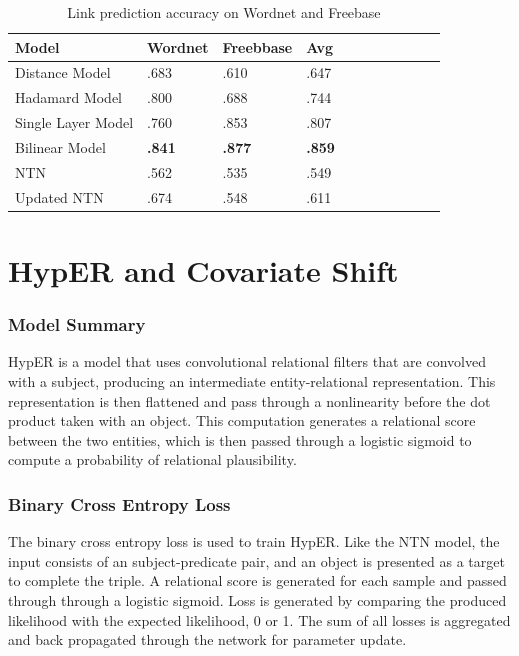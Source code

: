 \begin{table}[H]
	\centering
	\begin{tabular}{lllllllllll}
  		\textbf{Model} & \textbf{Wordnet} & \textbf{Freebbase} & \textbf{Avg} \\
  		\hline
  		Distance Model & .683 & .610 & .647 \\
  		Hadamard Model & .800 & .688 & .744 \\
  		Single Layer Model & .760 & .853 & .807 \\
  		Bilinear Model & \textbf{.841} & \textbf{.877} & \textbf{.859} \\
  		NTN & .562 & .535 & .549 \\
  		\hline
  		Updated NTN & .674 & .548 & .611 \\
	\end{tabular}
	\caption{Link prediction accuracy on Wordnet and Freebase}
\end{table}



\section{HypER and Covariate Shift}

\subsubsection{Model Summary} 
HypER is a model that uses convolutional relational filters that are convolved with a subject, producing an intermediate entity-relational representation. This representation is then flattened and pass through a nonlinearity before the dot product taken with an object. This computation generates a relational score between the two entities, which is then passed through a logistic sigmoid to compute a probability of relational plausibility. \newpage

\subsubsection{Binary Cross Entropy Loss}
The binary cross entropy loss is used to train HypER. Like the NTN model, the input consists of an subject-predicate pair, and an object is presented as a target to complete the triple. A relational score is generated for each sample and passed through through a logistic sigmoid. Loss is generated by comparing the produced likelihood with the expected likelihood, 0 or 1. The sum of all losses is aggregated and back propagated through the network for parameter update. 

